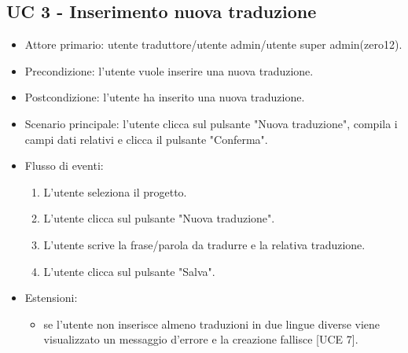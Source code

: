 \subsection{UC 3 - Inserimento nuova traduzione}
    \begin{itemize}
        \item Attore primario: utente traduttore/utente admin/utente super admin(zero12).
        \item Precondizione: l'utente vuole inserire una nuova traduzione.
        \item Postcondizione: l'utente ha inserito una nuova traduzione.
        \item Scenario principale: l'utente clicca sul pulsante "Nuova traduzione", compila i campi dati relativi e clicca il pulsante "Conferma".
        \item Flusso di eventi:
            \begin{enumerate}
                \item L'utente seleziona il progetto.
                \item L'utente clicca sul pulsante "Nuova traduzione".
                \item L'utente scrive la frase/parola da tradurre e la relativa traduzione.
                \item L'utente clicca sul pulsante "Salva".
            \end{enumerate}
        \item Estensioni:
            \begin{itemize}
                \item se l'utente non inserisce almeno traduzioni in due lingue diverse viene visualizzato un messaggio d'errore e la creazione fallisce [UCE 7].
            \end{itemize}
    \end{itemize}
